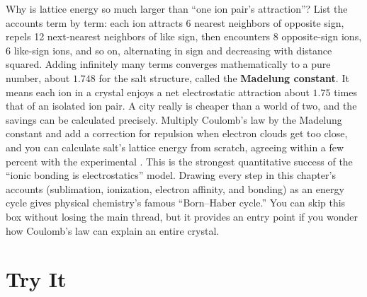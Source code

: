 \begin{tiaozhan}
Why is lattice energy so much larger than ``one ion pair's attraction''? List the accounts term by term: each ion attracts 6 nearest neighbors of opposite sign, repels 12 next-nearest neighbors of like sign, then encounters 8 opposite-sign ions, 6 like-sign ions, and so on, alternating in sign and decreasing with distance squared. Adding infinitely many terms converges mathematically to a pure number, about $1.748$ for the salt structure, called the \textbf{Madelung constant}. It means each ion in a crystal enjoys a net electrostatic attraction about $1.75$ times that of an isolated ion pair. A city really is cheaper than a world of two, and the savings can be calculated precisely. Multiply Coulomb's law by the Madelung constant and add a correction for repulsion when electron clouds get too close, and you can calculate salt's lattice energy from scratch, agreeing within a few percent with the experimental . This is the strongest quantitative success of the ``ionic bonding is electrostatics'' model. Drawing every step in this chapter's accounts (sublimation, ionization, electron affinity, and bonding) as an energy cycle gives physical chemistry's famous ``Born--Haber cycle.'' You can skip this box without losing the main thread, but it provides an entry point if you wonder how Coulomb's law can explain an entire crystal.
\end{tiaozhan}

\section*{Try It}

